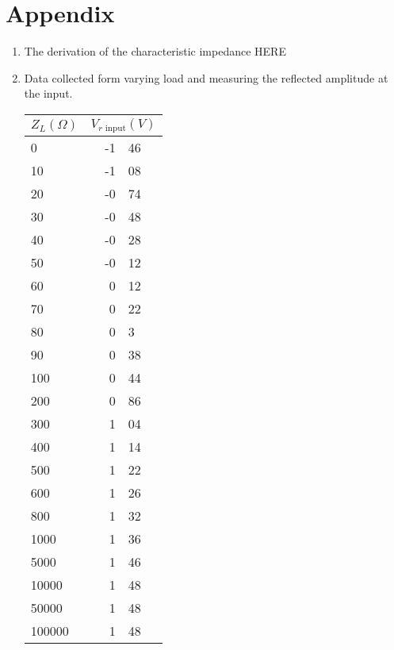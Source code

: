 \section{Appendix}

\begin{enumerate}
\item
The derivation of the characteristic impedance HERE
\item\label{app:data1}
Data collected form varying load and measuring the reflected amplitude at the 
input.
\begin{table}[htbp]
\centering
\footnotesize
\begin{tabular}{|l|r@{.}l|}
\hline
\multicolumn{1}{|c|}{$Z_L (\Omega)$} & \multicolumn{2}{|c|}{$V_{r \text{ input}} (V)$}\\
\hline
0 & -1&46 \\
10 & -1&08 \\
20 & -0&74 \\
30 & -0&48 \\
40 & -0&28 \\
50 & -0&12 \\
60 & 0&12 \\
70 & 0&22 \\
80 & 0&3 \\
90 & 0&38 \\
100 & 0&44 \\
200 & 0&86 \\
300 & 1&04 \\
400 & 1&14 \\
500 & 1&22 \\
600 & 1&26 \\
800 & 1&32 \\
1000 & 1&36 \\
5000 & 1&46 \\
10000 & 1&48 \\
50000 & 1&48 \\
100000 & 1&48 \\\hline
\end{tabular}
\end{table}
\end{enumerate}

